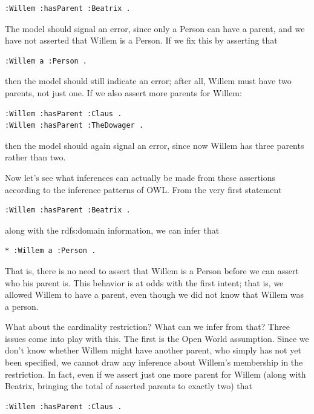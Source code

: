 \begin{lstlisting}
:Willem :hasParent :Beatrix .
\end{lstlisting}

The model should signal an error, since only a Person can have a parent,
and we have not asserted that Willem is a Person. If we fix this by
asserting that

\begin{lstlisting}
:Willem a :Person .
\end{lstlisting}

then the model should still indicate an error; after all, Willem must
have two parents, not just one. If we also assert more parents for
Willem:

\begin{lstlisting}
:Willem :hasParent :Claus .
:Willem :hasParent :TheDowager .
\end{lstlisting}

then the model should again signal an error, since now Willem has three
parents rather than two.

Now let's see what inferences can actually be made from these assertions
according to the inference patterns of OWL. From the very first
statement

\begin{lstlisting}
:Willem :hasParent :Beatrix .
\end{lstlisting}

along with the rdfs:domain information, we can infer that

\begin{lstlisting}
* :Willem a :Person .
\end{lstlisting}

That is, there is no need to assert that Willem is a Person before we
can assert who his parent is. This behavior is at odds with the first
intent; that is, we allowed Willem to have a parent, even though we did
not know that Willem was a person.

What about the cardinality restriction? What can we infer from that?
Three issues come into play with this. The first is the Open World
assumption. Since we don't know whether Willem might have another
parent, who simply has not yet been specified, we cannot draw any
inference about Willem's membership in the restriction. In fact, even if
we assert just one more parent for Willem (along with Beatrix, bringing
the total of asserted parents to exactly two) that

\begin{lstlisting}
:Willem :hasParent :Claus .
\end{lstlisting}

